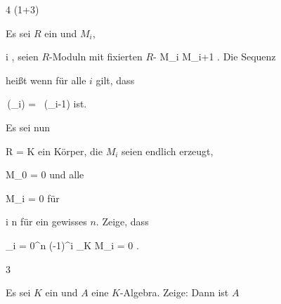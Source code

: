 {4 (1+3)}
{





Es sei $R$ ein
und $M_i$,

\mavergleichskette
{\vergleichskette
{ i
}
{ \in }{ \N
}
{  }{
}
{    }{
}
{   }{
}
}
{}{}{,}
seien $R$-Moduln mit fixierten
$R$-
 { M_i } { M_{i+1}
} {.}
Die Sequenz

 {  }

heißt
 wenn für alle $i$ gilt, dass

\mavergleichskette
{\vergleichskette
{  \,(\varphi_{i})
}
{ = }{  \, (\varphi_{i-1})
}
{  }{
}
{    }{
}
{   }{
}
}
{}{}{}
ist.
 {Es sei nun

\mavergleichskette
{\vergleichskette
{ R
}
{ = }{ K
}
{  }{
}
{    }{
}
{   }{
}
}
{}{}{}
ein Körper, die $M_i$ seien  endlich erzeugt,

\mavergleichskette
{\vergleichskette
{ M_0
}
{ = }{ 0
}
{  }{
}
{    }{
}
{   }{
}
}
{}{}{}
und alle

\mavergleichskette
{\vergleichskette
{ M_i
}
{ = }{ 0
}
{  }{
}
{    }{
}
{   }{
}
}
{}{}{}
für

\mavergleichskette
{\vergleichskette
{ i
}
{ \geq }{ n
}
{  }{
}
{    }{
}
{   }{
}
}
{}{}{}
für ein gewisses $n$. Zeige, dass

\mavergleichskettedisp
{\vergleichskette
{ \sum_{i = 0}^{n} (-1)^i _K M_i
}
{ =} { 0
}
{ } {
}
{ } {
}
{ } {
}
}
{}{}{.}
}





}
{} {}

{3}
{





Es sei $K$ ein
 und $A$ eine
$K$-Algebra. Zeige: Dann ist $A$





}
{} {}
